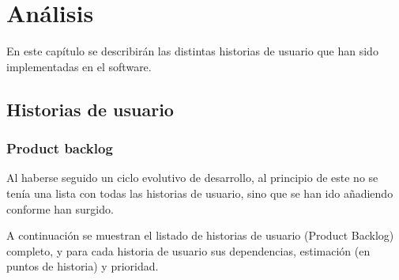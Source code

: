 \chapter{Análisis}

En este capítulo se describirán las distintas historias de usuario que han sido implementadas en el software.

\section{Historias de usuario}

\subsection{Product backlog}

Al haberse seguido un ciclo evolutivo de desarrollo, al principio de este no se tenía una lista con todas las historias de usuario, sino que se han ido añadiendo conforme han surgido.

A continuación se muestran el listado de historias de usuario (Product Backlog) completo, y para cada historia de usuario sus dependencias, estimación (en puntos de historia) y prioridad.

